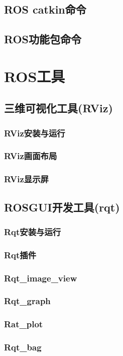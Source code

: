 \documentclass[geye,green,kindle,cn]{elegantnote}
\begin{document}
\subsection{ROS catkin命令}
\subsection{ROS功能包命令}
\section{ROS工具}
\subsection{三维可视化工具(RViz)}
\subsubsection{RViz安装与运行}
\subsubsection{RViz画面布局}
\subsubsection{RViz显示屏}
\subsection{ROSGUI开发工具(rqt)}
\subsubsection{Rqt安装与运行}
\subsubsection{Rqt插件}
\subsubsection{Rqt\_image\_view}
\subsubsection{Rqt\_graph}
\subsubsection{Rat\_plot}
\subsubsection{Rqt\_bag}
\end{document}
